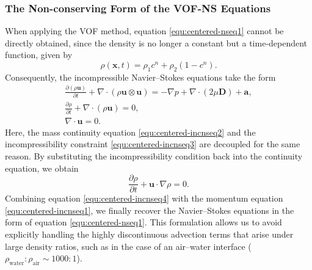 \subsubsection{The Non-conserving Form of the VOF-NS Equations}
When applying the VOF method, equation \ref{equ:centered-nseq1} cannot be directly obtained, since the density is no longer a constant but a time-dependent function, given by
\begin{equation}
    \rho(\mathbf{x}, t) = \rho_1 c^n + \rho_2 (1 - c^n).
\end{equation}
Consequently, the incompressible Navier--Stokes equations take the form
\begin{gather}
    \frac{\partial (\rho \mathbf{u})}{\partial t} 
    + \nabla \cdot (\rho \mathbf{u} \otimes \mathbf{u}) 
    = -\nabla p + \nabla \cdot (2 \mu \mathbf{D}) 
    + \mathbf{a}, \label{equ:centered-incnseq1} \\
    \frac{\partial \rho}{\partial t} + \nabla \cdot (\rho \mathbf{u}) = 0, \label{equ:centered-incnseq2} \\
    \nabla \cdot \mathbf{u} = 0. \label{equ:centered-incnseq3}
\end{gather}
Here, the mass continuity equation \ref{equ:centered-incnseq2} and the incompressibility constraint \ref{equ:centered-incnseq3} are decoupled for the same reason.  
By substituting the incompressibility condition back into the continuity equation, we obtain
\begin{equation}
    \frac{\partial \rho}{\partial t} + \mathbf{u} \cdot \nabla \rho = 0. \label{equ:centered-incnseq4}
\end{equation}
Combining equation \ref{equ:centered-incnseq4} with the momentum equation \ref{equ:centered-incnseq1}, we finally recover the Navier--Stokes equations in the form of equation \ref{equ:centered-nseq1}.  
This formulation allows us to avoid explicitly handling the highly discontinuous advection terms that arise under large density ratios, such as in the case of an air--water interface ($\rho_\text{water} : \rho_\text{air} \sim 1000:1$).

\printbibliography
